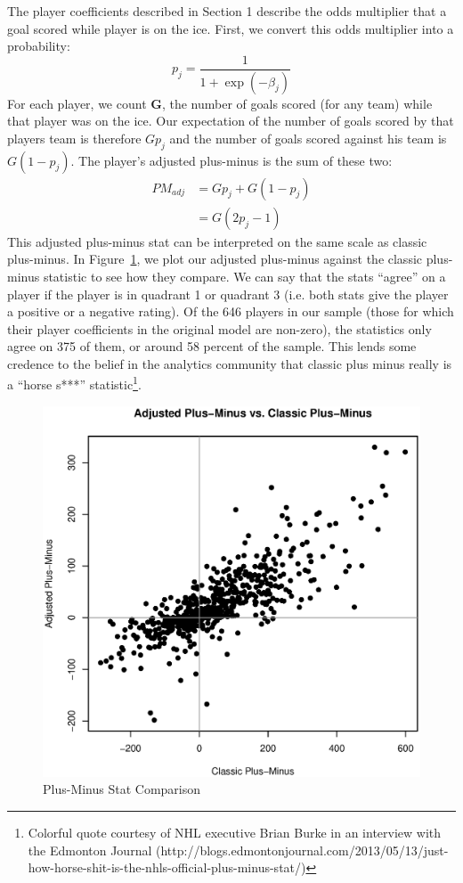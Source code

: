 \documentclass[11pt, fleqn]{article}
\begin{document}
The player coefficients described in Section 1 describe the odds multiplier that a goal scored while player is on the ice. First, we convert this odds multiplier into a probability:
\[ p_j = \frac{1}{1+\exp \left(-\beta_j\right)} \]
For each player, we count \textbf{G}, the number of goals scored (for any team) while that player was on the ice. Our expectation of the number of goals scored by that players team is therefore $G p_j$ and the number of goals scored against his team is $G (1-p_j)$. The player's adjusted plus-minus is the sum of these two:
\begin{align*} 
PM_{adj} & = G p_j + G (1-p_j) \\
 & = G (2 p_j - 1)
\end{align*}
This adjusted plus-minus stat can be interpreted on the same scale as classic plus-minus. In Figure~\ref{fig:pm_compare}, we plot our adjusted plus-minus against the classic plus-minus statistic to see how they compare. We can say that the stats ``agree'' on a player if the player is in quadrant 1 or quadrant 3 (i.e. both stats give the player a positive or a negative rating). Of the 646 players in our sample (those for which their player coefficients in the original model are non-zero), the statistics only agree on 375 of them, or around 58 percent of the sample. This lends some credence to the belief in the analytics community that classic plus minus really is a ``horse s***'' statistic\footnote{Colorful quote courtesy of NHL executive Brian Burke in an interview with the Edmonton Journal (http://blogs.edmontonjournal.com/2013/05/13/just-how-horse-shit-is-the-nhls-official-plus-minus-stat/)}.

\begin{figure}[!htb]
  \centering
  \includegraphics[scale=.5]{pm_compare.eps}
  \caption{Plus-Minus Stat Comparison}
  \label{fig:pm_compare}
\end{figure}
\end{document}
